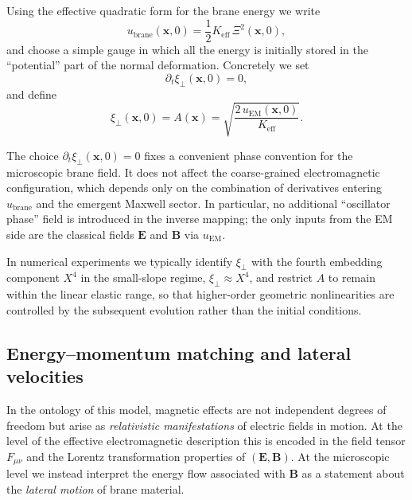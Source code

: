 Using the effective quadratic form for the brane energy we write
\begin{equation}
  u_{\mathrm{brane}}(\mathbf x,0)
  = \frac{1}{2} K_{\mathrm{eff}}\,\Xi^2(\mathbf x,0),
\end{equation}
and choose a simple gauge in which all the energy is initially stored
in the ``potential'' part of the normal deformation. Concretely we set
\begin{equation}
  \partial_t\xi_\perp(\mathbf x,0) = 0,
\end{equation}
and define
\begin{equation}
  \xi_\perp(\mathbf x,0)
  = A(\mathbf x)
  = \sqrt{\frac{2\,u_{\mathrm{EM}}(\mathbf x,0)}{K_{\mathrm{eff}}}}.
  \label{eq:app-xi-initial}
\end{equation}

The choice $\partial_t\xi_\perp(\mathbf x,0)=0$ fixes a convenient
phase convention for the microscopic brane field. It does not affect
the coarse-grained electromagnetic configuration, which depends only on
the combination of derivatives entering $u_{\mathrm{brane}}$ and the
emergent Maxwell sector. In particular, no additional ``oscillator
phase'' field is introduced in the inverse mapping; the only inputs
from the EM side are the classical fields $\mathbf E$ and $\mathbf B$
via $u_{\mathrm{EM}}$.

In numerical experiments we typically identify $\xi_\perp$ with the
fourth embedding component $X^4$ in the small-slope regime,
$\xi_\perp\approx X^4$, and restrict $A$ to remain within the linear
elastic range, so that higher-order geometric nonlinearities are
controlled by the subsequent evolution rather than the initial
conditions.

\subsection{Energy--momentum matching and lateral velocities}
\label{app:poynting-lateral}

In the ontology of this model, magnetic effects are not independent
degrees of freedom but arise as \emph{relativistic manifestations} of
electric fields in motion. At the level of the effective electromagnetic
description this is encoded in the field tensor $F_{\mu\nu}$ and the
Lorentz transformation properties of $(\mathbf E,\mathbf B)$. At the
microscopic level we instead interpret the energy flow associated with
$\mathbf B$ as a statement about the \emph{lateral motion} of brane
material.


